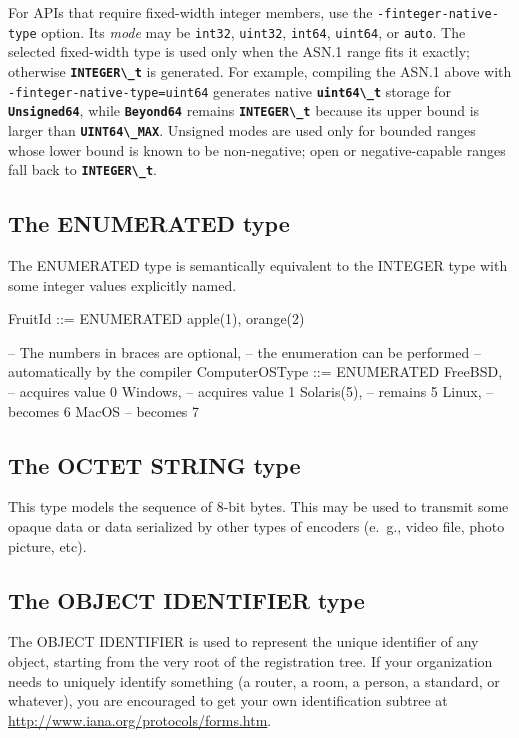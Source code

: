 \documentclass[english,oneside,12pt]{book}
\newcommand{\code}[1]{\texttt{\textbf{\lstinline{#1}}}}
\newcommand{\cmd}[1]{\texttt{#1}}
\begin{document}
For APIs that require fixed-width integer members, use the
\cmd{-finteger-native-type} option. Its \emph{mode} may be \cmd{int32},
\cmd{uint32}, \cmd{int64}, \cmd{uint64}, or \cmd{auto}. The selected
fixed-width type is used only when the ASN.1 range fits it exactly;
otherwise \code{INTEGER\_t} is generated. For example, compiling the ASN.1
above with \cmd{-finteger-native-type=uint64} generates native
\code{uint64\_t} storage for \code{Unsigned64}, while \code{Beyond64} remains
\code{INTEGER\_t} because its upper bound is larger than \code{UINT64\_MAX}.
Unsigned modes are used only for bounded ranges whose lower bound is known to
be non-negative; open or negative-capable ranges fall back to
\code{INTEGER\_t}.

\subsection{The ENUMERATED type}

The ENUMERATED type is semantically equivalent to the INTEGER type
with some integer values explicitly named.
\begin{asn}
FruitId ::= ENUMERATED { apple(1), orange(2) }

-- The numbers in braces are optional,
-- the enumeration can be performed
-- automatically by the compiler
ComputerOSType ::= ENUMERATED {
    FreeBSD,          -- acquires value 0
    Windows,          -- acquires value 1
    Solaris(5),       -- remains 5
    Linux,            -- becomes 6
    MacOS             -- becomes 7
}
\end{asn}

\subsection{The OCTET STRING type}

This type models the sequence of 8-bit bytes. This may be used to
transmit some opaque data or data serialized by other types of encoders
(e.~g., video file, photo picture, etc).

\subsection{The OBJECT IDENTIFIER type}

The OBJECT IDENTIFIER is used to represent the unique identifier of
any object, starting from the very root of the registration tree.
If your organization needs to uniquely identify something (a router,
a room, a person, a standard, or whatever), you are encouraged to
get your own identification subtree at \url{http://www.iana.org/protocols/forms.htm}.
\end{document}
